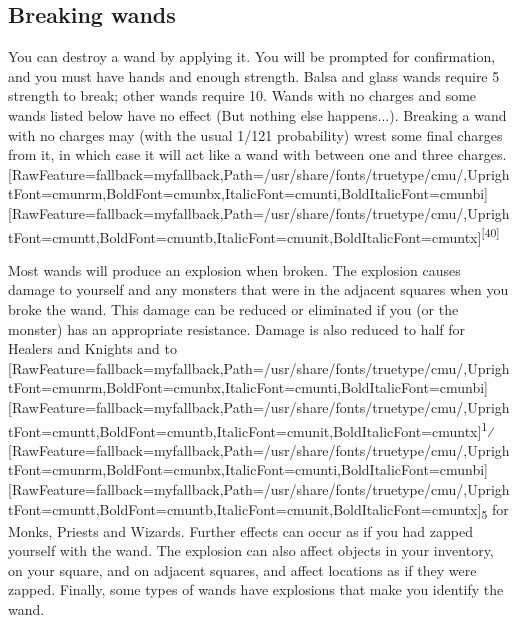 \subsection{Breaking wands}
\label{10}
You can destroy a wand by a\footnotemark[133]pplying it. You will be prompted for confirmation, and you must have hands and enough strength. Balsa and glass wands require 5 strength to break; other wands require 10. Wands with no charges and some wands listed below have no effect (But nothing else happens...). Breaking a wand with no charges may (with the usual 1/121 probability) wrest\footnotemark[134] some final charges from it, in which case it will act like a wand with between one and three charges.\allowbreak{}\setmainfont{cmunrm.ttf}[RawFeature={fallback=myfallback},Path=/usr/share/fonts/truetype/cmu/,UprightFont=cmunrm,BoldFont=cmunbx,ItalicFont=cmunti,BoldItalicFont=cmunbi]\setmonofont{cmunrm.ttf}[RawFeature={fallback=myfallback},Path=/usr/share/fonts/truetype/cmu/,UprightFont=cmuntt,BoldFont=cmuntb,ItalicFont=cmunit,BoldItalicFont=cmuntx]\textsuperscript{{$\text{[}$}40{$\text{]}$}}


Most wands will produce an explosion when broken. The explosion causes damage to yourself and any monsters that were in the adjacent squares when you broke the wand. This damage can be reduced or eliminated if you (or the monster) has an appropriate resistance. Damage is also reduced to half for Healers and Knights and to \allowbreak{}\setmainfont{cmunrm.ttf}[RawFeature={fallback=myfallback},Path=/usr/share/fonts/truetype/cmu/,UprightFont=cmunrm,BoldFont=cmunbx,ItalicFont=cmunti,BoldItalicFont=cmunbi]\setmonofont{cmunrm.ttf}[RawFeature={fallback=myfallback},Path=/usr/share/fonts/truetype/cmu/,UprightFont=cmuntt,BoldFont=cmuntb,ItalicFont=cmunit,BoldItalicFont=cmuntx]\textsuperscript{1}⁄\allowbreak{}\setmainfont{cmunrm.ttf}[RawFeature={fallback=myfallback},Path=/usr/share/fonts/truetype/cmu/,UprightFont=cmunrm,BoldFont=cmunbx,ItalicFont=cmunti,BoldItalicFont=cmunbi]\setmonofont{cmunrm.ttf}[RawFeature={fallback=myfallback},Path=/usr/share/fonts/truetype/cmu/,UprightFont=cmuntt,BoldFont=cmuntb,ItalicFont=cmunit,BoldItalicFont=cmuntx]\textsubscript{5} for Monks, Priests and Wizards. Further effects can occur as if you had zapped yourself with the wand. The explosion can also affect objects in your inventory, on your square, and on adjacent squares, and affect locations as if they were zapped. Finally, some types of wands have explosions that make you identify the wand.


